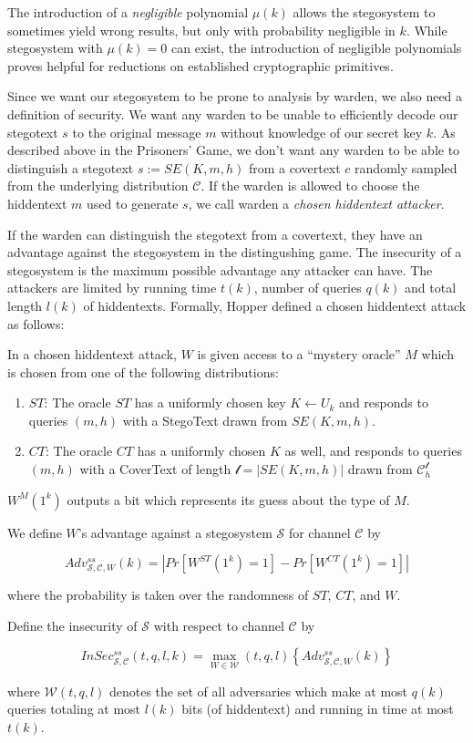 The introduction of a \emph{negligible} polynomial $\mu(k)$ allows the stegosystem to sometimes yield wrong results, but only with probability negligible in $k$.
While stegosystem with $\mu(k) = 0$ can exist, the introduction of negligible polynomials proves helpful for reductions on established cryptographic primitives. 

Since we want our stegosystem to be prone to analysis by warden, we also need a definition of security.
We want any warden to be unable to efficiently decode our stegotext $s$ to the original message $m$ without knowledge of our secret key $k$.
As described above in the Prisoners' Game, we don't want any warden to be able to distinguish a stegotext $s := SE(K, m, h)$ from a covertext $c$ randomly sampled from the underlying distribution $\mathcal{C}$.
If the warden is allowed to choose the hiddentext $m$ used to generate $s$, we call warden a \emph{chosen hiddentext attacker}. 

If the warden can distinguish the stegotext from a covertext, they have an advantage against the stegosystem in the distingushing game.
The insecurity of a stegosystem is the maximum possible advantage any attacker can have.
The attackers are limited by running time $t(k)$, number of queries $q(k)$ and total length $l(k)$ of hiddentexts.
Formally, Hopper defined a chosen hiddentext attack as follows:

\begin{definition}
In a chosen hiddentext attack, $W$ is given access to a ``mystery oracle'' $M$ which is chosen from one of the following distributions:

\begin{enumerate}
\item $ST$: The oracle $ST$ has a uniformly chosen key $K \leftarrow U_k$ and responds to queries $(m, h)$ with a StegoText drawn from $SE(K, m, h)$.
\item $CT$: The oracle $CT$ has a uniformly chosen $K$ as well, and responds to queries $(m, h)$ with a CoverText of length $\mathcal{l} = |SE(K, m, h)|$ drawn from $\mathcal{C}_h^{\mathcal{l}}$
\end{enumerate}

$W^M(1^k)$ outputs a bit which represents its guess about the type of $M$.

We define $W$'s advantage against a stegosystem $\mathcal{S}$ for channel $\mathcal{C}$ by

$$Adv_{\mathcal{S}, \mathcal{C}, W}^{ss}(k) = |Pr[W^{ST}(1^k)=1] - Pr[W^{CT}(1^k)=1]|$$

where the probability is taken over the randomness of $ST$, $CT$, and $W$. 

Define the insecurity of $\mathcal{S}$ with respect to channel $\mathcal{C}$ by

$$InSec_{\mathcal{S}, \mathcal{C}}^{ss}(t, q, l, k) = \max_{W \in \mathcal{W}}(t, q, l) \left\{ Adv_{\mathcal{S}, \mathcal{C}, W}^{ss}(k) \right\}$$

where $\mathcal{W}(t, q, l)$ denotes the set of all adversaries which make at most $q(k)$ queries totaling at most $l(k)$ bits (of hiddentext) and running in time at most $t(k)$.
\end{definition}

